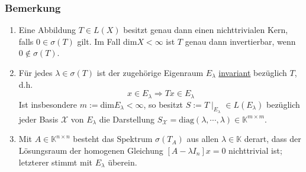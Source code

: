 \subsubsection{Bemerkung}
\label{4.2.2}
\renewcommand{\labelenumi}{(\arabic{enumi})}
\begin{enumerate}
\item Eine Abbildung $T\in L(X)$ besitzt genau dann einen nichttrivialen Kern, falls $0\in \sigma (T)$ gilt.  Im Fall dim$X < \infty$ ist $T$ genau dann invertierbar, wenn $0\not\in\sigma (T)$.
\item Für jedes $\lambda \in \sigma (T)$ ist der zugehörige Eigenraum $E_\lambda$ \underline{invariant} bezüglich $T$, d.h.
\[x\in E_\lambda \Rightarrow Tx\in E_\lambda\]
Ist insbesondere $m:=$dim$E_\lambda<\infty$, so besitzt $S:=T\mid _{E_\lambda} \in L(E_\lambda)$ bezüglich jeder Basis $\mathcal{X}$ von $E_\lambda$ die Darstellung $S_\mathcal{X}=\mathrm{diag}(\lambda ,\cdots ,\lambda )\in\mathbb{K}^{m\times m}$.
\item Mit $A\in\mathbb{K}^{n\times n}$ besteht das Spektrum $\sigma (T_A)$ aus allen $\lambda\in\mathbb{K}$ derart, dass der Lösungsraum der homogenen Gleichung $[A-\lambda I_n]x=0$ nichttrivial ist; letzterer stimmt mit $E_\lambda$ überein.
\end{enumerate}
